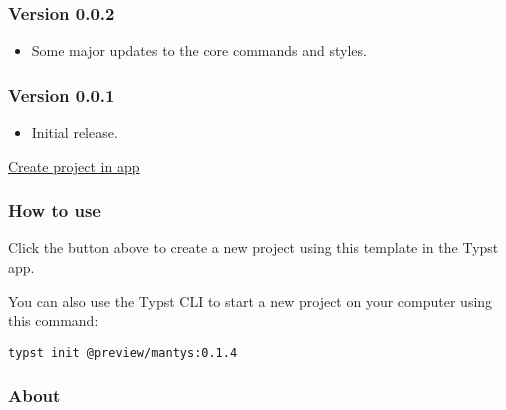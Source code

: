 \subsubsection{Version 0.0.2}\label{version-0.0.2}

\begin{itemize}
\tightlist
\item
  Some major updates to the core commands and styles.
\end{itemize}

\subsubsection{Version 0.0.1}\label{version-0.0.1}

\begin{itemize}
\tightlist
\item
  Initial release.
\end{itemize}

\href{/app?template=mantys&version=0.1.4}{Create project in app}

\subsubsection{How to use}\label{how-to-use}

Click the button above to create a new project using this template in
the Typst app.

You can also use the Typst CLI to start a new project on your computer
using this command:

\begin{verbatim}
typst init @preview/mantys:0.1.4
\end{verbatim}



\subsubsection{About}\label{about}

